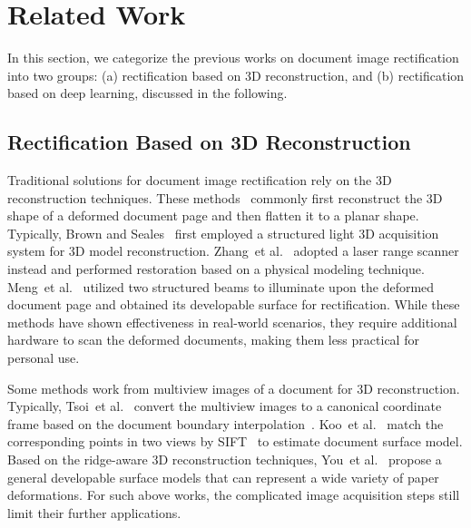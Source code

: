 \documentclass[lettersize,journal]{IEEEtran}
\begin{document}
\section{Related Work}
In this section, we categorize the previous works on document image rectification into
two groups: (a) rectification based on 3D reconstruction, and (b)
rectification based on deep learning, discussed in the following.


\subsection{Rectification Based on 3D Reconstruction} 
Traditional solutions for document image rectification rely on the 3D reconstruction techniques. These methods~\cite{brown2004image,937649,6909892,4407722} commonly first reconstruct the 3D shape of a deformed document page and then flatten it to a planar shape.
Typically, Brown and Seales~\cite{937649} first employed a structured light 3D acquisition system for 3D model reconstruction.
Zhang~et al.~\cite{4407722} adopted a laser range scanner instead and performed restoration based on a physical modeling technique. 
Meng~et al.~\cite{6909892} utilized two structured beams to illuminate upon the deformed document page and obtained its developable surface for rectification.
While these methods have shown effectiveness in real-world scenarios, they require additional hardware to scan the deformed documents, making them less practical for personal use.
	
Some methods work from multiview images of a document for 3D reconstruction.
Typically, Tsoi~et al.~\cite{tsoi2007multi} convert the multiview images to a canonical coordinate frame based on the document boundary interpolation~\cite{tsoi2004geometric}.
Koo~et al.~\cite{4916075} match the corresponding points in two views by SIFT~\cite{lowe2004distinctive} to estimate document surface model.
Based on the ridge-aware 3D reconstruction techniques, You~et al.~\cite{Shaodi} propose a general developable surface models that can represent a wide variety of paper deformations.
For such above works, the complicated image acquisition steps still limit their further applications.
\end{document}
